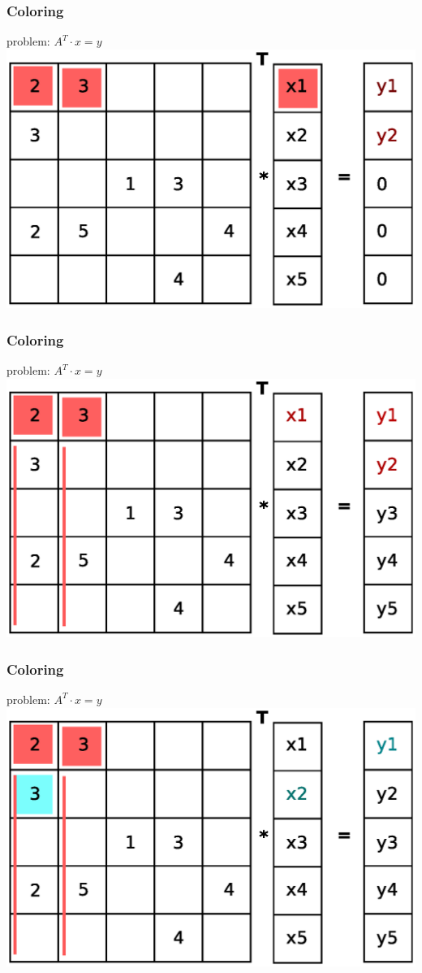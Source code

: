 \documentclass{beamer}
\begin{document}
\begin{frame}
\frametitle{Coloring}
problem: $A^T \cdot x= y$
\includegraphics[width=0.8\linewidth]{graphic/coloringT4.eps}
\end{frame}

\begin{frame}
\frametitle{Coloring}
problem: $A^T \cdot x= y$
\includegraphics[width=0.8\linewidth]{graphic/coloringT5.eps}
\end{frame}

\begin{frame}
\frametitle{Coloring}
problem: $A^T \cdot x= y$
\includegraphics[width=0.8\linewidth]{graphic/coloringT6.eps}
\end{frame}
\end{document}
